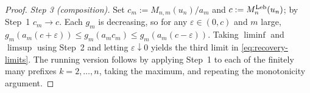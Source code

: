 \documentclass{article}
\begin{document}
\begin{proof}
\emph{Step 3 (composition).}
Set \(c_m:=M_{n,m}(u_n)/a_m\) and \(c:=M_n^{\mathrm{Leb}}(u_n)\); by Step~1 \(c_m\to c\). Each \(g_m\) is decreasing, so for any \(\varepsilon\in(0,c)\) and \(m\) large, \(g_m(a_m(c+\varepsilon))\leq g_m(a_m c_m)\leq g_m(a_m(c-\varepsilon))\). Taking \(\liminf\) and \(\limsup\) using Step~2 and letting \(\varepsilon\downarrow 0\) yields the third limit in \eqref{eq:recovery-limits}. The running version follows by applying Step~1 to each of the finitely many prefixes $k=2,\ldots,n$, taking the maximum, and repeating the monotonicity argument.
\end{proof}


\end{document}
